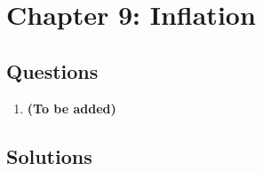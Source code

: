 \clearpage
\section{Chapter 9: Inflation}

\subsection{Questions}

\begin{enumerate}[label=9.\arabic*]
  \item \label{q:9.1} \textbf{(To be added)}
\end{enumerate}

\bigskip
\bigskip
\bigskip

\subsection{Solutions}

